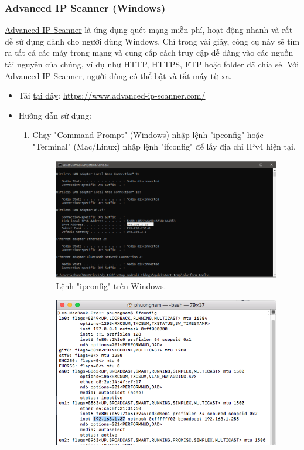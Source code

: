 \subsubsection{Advanced IP Scanner (Windows)}
\label{scanip}
\href{https://www.advanced-ip-scanner.com/}{Advanced IP Scanner} là ứng dụng quét mạng miễn phí, hoạt động nhanh và rất dễ sử dụng dành cho người dùng Windows. Chỉ trong vài giây, công cụ này sẽ tìm ra tất cả các máy trong mạng và cung cấp cách truy cập dễ dàng vào các nguồn tài nguyên của chúng, ví dụ như HTTP, HTTPS, FTP hoặc folder đã chia sẻ. Với Advanced IP Scanner, người dùng có thể bật và tắt máy từ xa.
\begin{itemize}
\item Tải \href{https://www.advanced-ip-scanner.com/}{tại đây}: \url{https://www.advanced-ip-scanner.com/}
\item Hướng dẫn sử dụng:
\begin{enumerate}
\item Chạy "Command Prompt" (Windows) nhập lệnh "ipconfig" hoặc "Terminal" (Mac/Linux) nhập lệnh "ifconfig" để lấy địa chỉ IPv4 hiện tại.
\begin{center}
\begin{figure}[htp]
\begin{center}
\includegraphics[scale=0.5]{image3/ipconfig.jpg}
\end{center}
\caption{Lệnh "ipconfig" trên Windows.}
\label{refhinh1}
\end{figure}
\end{center}
\begin{center}
\begin{figure}[htp]
\begin{center}
\includegraphics[scale=0.6]{image3/ifconfig.png}

\end{center}
\end{figure}
\end{center}
\end{enumerate}
\end{itemize}
